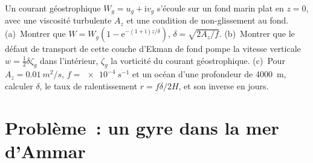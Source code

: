 \begin{exercise}[$\star\star\star$]\label{exo:b3:ocean-dynamics:12}
Un courant géostrophique $W_g = u_g + \mathrm iv_g$ s'écoule sur un fond marin plat en
$z = 0$, avec une viscosité turbulente $A_z$ et une condition de non-glissement au fond.
(a)~Montrer que $W = W_g(1 - \mathrm e^{-(1+\mathrm i)z/\delta})$, $\delta =
\sqrt{2A_z/f}$. (b)~Montrer que le défaut de transport de cette couche d'Ekman de fond
pompe la vitesse verticale $w = \tfrac12\delta\zeta_g$ dans l'intérieur,
$\zeta_g$ la vorticité du courant géostrophique. (c)~Pour
$A_z = \qty{0.01}{m^2/s}$, $f = \qty{e-4}{s^{-1}}$ et un océan
d'une profondeur de \qty{4000}{m}, calculer $\delta$, le taux de ralentissement $r =
f\delta/2H$, et son inverse en jours.
\end{exercise}

\section{Problème~: un gyre dans la mer d'Ammar}

